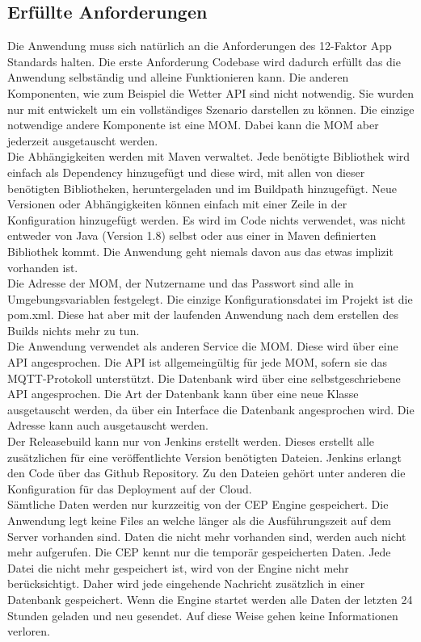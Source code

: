 \subsection{Erfüllte Anforderungen}
Die Anwendung muss sich natürlich an die Anforderungen des 12-Faktor App Standards halten. Die erste Anforderung Codebase wird dadurch erfüllt das die Anwendung selbständig und alleine Funktionieren kann. Die anderen Komponenten, wie zum Beispiel die Wetter API sind nicht notwendig. Sie wurden nur mit entwickelt um ein vollständiges Szenario darstellen zu können. Die einzige notwendige andere Komponente ist eine MOM. Dabei kann die MOM aber jederzeit ausgetauscht werden. 
\\
Die Abhängigkeiten werden mit Maven verwaltet. Jede benötigte Bibliothek wird einfach als Dependency hinzugefügt und diese wird, mit allen von dieser benötigten Bibliotheken, heruntergeladen und im Buildpath hinzugefügt. Neue Versionen oder Abhängigkeiten können einfach mit einer Zeile in der Konfiguration hinzugefügt werden. Es wird im Code nichts verwendet, was nicht entweder von Java (Version 1.8) selbst oder aus einer in Maven definierten Bibliothek kommt. Die Anwendung geht niemals davon aus das etwas implizit vorhanden ist.
\\
Die Adresse der MOM, der Nutzername und das Passwort sind alle in Umgebungsvariablen festgelegt. Die einzige Konfigurationsdatei im Projekt ist die pom.xml. Diese hat aber mit der laufenden Anwendung nach dem erstellen des Builds nichts mehr zu tun. 
\\
Die Anwendung verwendet als anderen Service die MOM. Diese wird über eine API angesprochen. Die API ist allgemeingültig für jede MOM, sofern sie das MQTT-Protokoll unterstützt. Die Datenbank wird über eine selbstgeschriebene API angesprochen. Die Art der Datenbank kann über eine neue Klasse ausgetauscht werden, da über ein Interface die Datenbank angesprochen wird. Die Adresse kann auch ausgetauscht werden. 
\\
Der Releasebuild kann nur von Jenkins erstellt werden. Dieses erstellt alle zusätzlichen für eine veröffentlichte Version benötigten Dateien. Jenkins erlangt den Code über das Github Repository. Zu den Dateien gehört unter anderen die Konfiguration für das Deployment auf der Cloud.
\\
Sämtliche Daten werden nur kurzzeitig von der CEP Engine gespeichert. Die Anwendung legt keine Files an welche länger als die Ausführungszeit auf dem Server vorhanden sind. Daten die nicht mehr vorhanden sind, werden auch nicht mehr aufgerufen. Die CEP kennt nur die temporär gespeicherten Daten. Jede Datei die nicht mehr gespeichert ist, wird von der Engine nicht mehr berücksichtigt. Daher wird jede eingehende Nachricht zusätzlich in einer Datenbank gespeichert. Wenn die Engine startet werden alle Daten der letzten 24 Stunden geladen und neu gesendet. Auf diese Weise gehen keine Informationen verloren.
